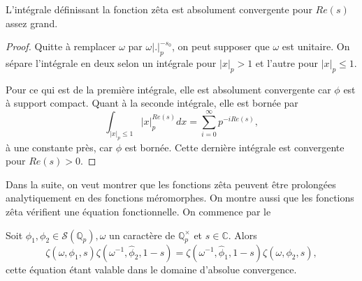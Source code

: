 \begin{lemme}
L'intégrale définissant la fonction zêta est absolument convergente pour $Re(s)$ assez grand.
\end{lemme}

\begin{proof}
Quitte à remplacer $\omega$ par $\omega|.|_p^{-s_0}$, on peut supposer que $\omega$ est unitaire. On sépare l'intégrale en deux selon un intégrale pour $|x|_p > 1$ et l'autre pour $|x|_p \leq 1$. 

Pour ce qui est de la première intégrale, elle est absolument convergente car $\phi$ est à support compact. Quant à la seconde intégrale, elle est bornée par
\begin{equation}
\int_{|x|_p \leq 1} |x|_p^{Re(s)}dx=\sum_{i=0}^{\infty} p^{-iRe(s)},
\end{equation}
à une constante près, car $\phi$ est bornée. Cette dernière intégrale est convergente pour $Re(s) > 0$.
\end{proof}

Dans la suite, on veut montrer que les fonctions zêta peuvent être prolongées analytiquement en des fonctions méromorphes. On montre aussi que les fonctions zêta vérifient une équation fonctionnelle. On commence par le
\begin{lemme}
\label{lemme_fun}
Soit $\phi_1, \phi_2 \in \mathcal{S}(\mathbb{Q}_p), \omega$ un caractère de $\mathbb{Q}_p^\times$ et $s \in \mathbb{C}$. Alors
\begin{equation}
\zeta(\omega, \phi_1, s)\zeta(\omega^{-1}, \hat{\phi}_2, 1-s)=\zeta(\omega^{-1}, \hat{\phi}_1, 1-s)\zeta(\omega, \phi_2, s),
\end{equation}
cette équation étant valable dans le domaine d'absolue convergence.
\end{lemme}

